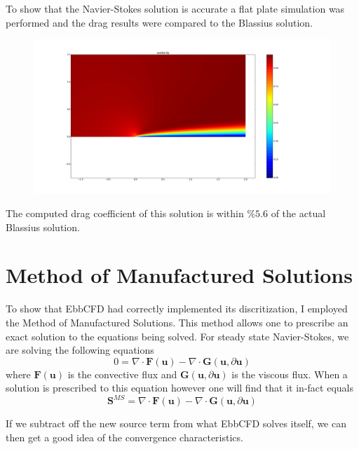 \documentclass[12pt,parskip=full]{article}
\numberwithin{subsection}{section}
\begin{document}
		To show that the Navier-Stokes solution is accurate a flat plate simulation was performed and the drag results were compared to the
		Blassius solution.

		\begin{figure}[H]
			\includegraphics[width=\textwidth]{FlatPlate.pdf}
		\end{figure}
		
		The computed drag coefficient of this solution is within $\%5.6$ of the actual Blassius solution.

	\section{Method of Manufactured Solutions}
		To show that EbbCFD had correctly implemented its discritization, I employed the Method of Manufactured Solutions. This method allows
		one to prescribe an exact solution to the equations being solved. For steady state Navier-Stokes, we are solving the following equations
		\begin{equation}
			0 = \nabla \cdot \boldsymbol{F}(\boldsymbol{u}) - \nabla \cdot \boldsymbol{G}(\boldsymbol{u}, \partial\boldsymbol{u})
		\end{equation}
		where $\boldsymbol{F}(\boldsymbol{u})$ is the convective flux and $\boldsymbol{G}(\boldsymbol{u}, \partial\boldsymbol{u})$ is the viscous flux.
		When a solution is prescribed to this equation however one will find that it in-fact equals
		\begin{equation}
			\boldsymbol{S}^{MS} = \nabla \cdot \boldsymbol{F}(\boldsymbol{u}) - \nabla \cdot \boldsymbol{G}(\boldsymbol{u}, \partial\boldsymbol{u})
		\end{equation}

		If we subtract off the new source term from what EbbCFD solves itself, we can then get a good idea of the convergence characteristics.
\end{document}

